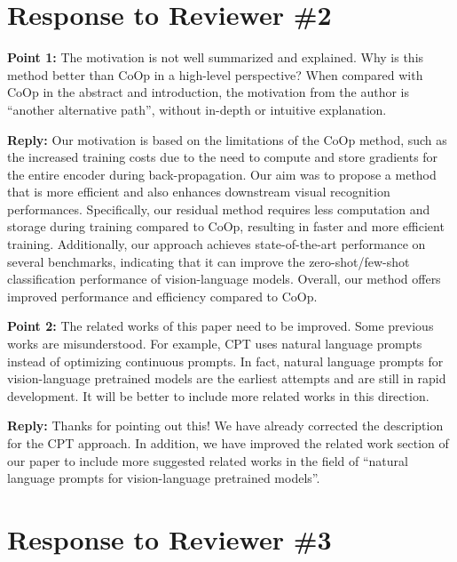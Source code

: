 \documentclass[default]{sn-jnl}%
\theoremstyle{thmstyleone}%
\theoremstyle{thmstyletwo}%
\theoremstyle{thmstylethree}%
\begin{document}
\section{Response to Reviewer \#2}
\label{sec:reviewer_2}

\noindent \textbf{Point 1:} The motivation is not well summarized and explained. Why is this method better than CoOp in a high-level perspective? When compared with CoOp in the abstract and introduction, the motivation from the author is ``another alternative path'', without in-depth or intuitive explanation. 

\noindent \textbf{Reply:} Our motivation is based on the limitations of the CoOp method, such as the increased training costs due to the need to compute and store gradients for the entire encoder during back-propagation. Our aim was to propose a method that is more efficient and also enhances downstream visual recognition performances. Specifically, our residual method requires less computation and storage during training compared to CoOp, resulting in faster and more efficient training. Additionally, our approach achieves state-of-the-art performance on several benchmarks, indicating that it can improve the zero-shot/few-shot classification performance of vision-language models. Overall, our method offers improved performance and efficiency compared to CoOp.

\vspace{5pt}
\noindent \textbf{Point 2:} The related works of this paper need to be improved. Some previous works are misunderstood. For example, CPT uses natural language prompts instead of optimizing continuous prompts. In fact, natural language prompts for vision-language pretrained models are the earliest attempts and are still in rapid development\cite{tsimpoukelli2021multimodal,alayrac2022flamingo,wang2022simvlm,yao-etal-2022-pevl}. It will be better to include more related works in this direction.

\noindent \textbf{Reply:} Thanks for pointing out this! We have already corrected the description for the CPT approach. In addition, we have improved the related work section of our paper to include more suggested related works in the field of ``natural language prompts for vision-language pretrained models''.


\section{Response to Reviewer \#3}
\label{sec:reviewer_3}
\end{document}
